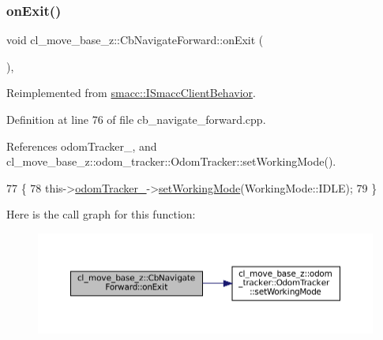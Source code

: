 \mbox{\label{classcl__move__base__z_1_1CbNavigateForward_a2160484562ef5fb1c655fab7f990241e}} 
\subsubsection{\texorpdfstring{on\+Exit()}{onExit()}}
{\footnotesize\ttfamily void cl\+\_\+move\+\_\+base\+\_\+z\+::\+Cb\+Navigate\+Forward\+::on\+Exit (\begin{DoxyParamCaption}{ }\end{DoxyParamCaption})\hspace{0.3cm}{\ttfamily [override]}, {\ttfamily [virtual]}}



Reimplemented from \hyperlink{classsmacc_1_1ISmaccClientBehavior_ad1198fdb2cbdf11f3276d3e23d4c0a50}{smacc\+::\+I\+Smacc\+Client\+Behavior}.



Definition at line 76 of file cb\+\_\+navigate\+\_\+forward.\+cpp.



References odom\+Tracker\+\_\+, and cl\+\_\+move\+\_\+base\+\_\+z\+::odom\+\_\+tracker\+::\+Odom\+Tracker\+::set\+Working\+Mode().


\begin{DoxyCode}
77 \{
78   this->\hyperlink{classcl__move__base__z_1_1CbNavigateForward_a7583a4d669af48618bd45950db8e5292}{odomTracker\_}->\hyperlink{classcl__move__base__z_1_1odom__tracker_1_1OdomTracker_aeed01bdefd9a1cc709b0b3e4eed285ed}{setWorkingMode}(WorkingMode::IDLE);
79 \}
\end{DoxyCode}
Here is the call graph for this function\+:
\nopagebreak
\begin{figure}[H]
\begin{center}
\leavevmode
\includegraphics[width=350pt]{classcl__move__base__z_1_1CbNavigateForward_a2160484562ef5fb1c655fab7f990241e_cgraph}
\end{center}
\end{figure}


